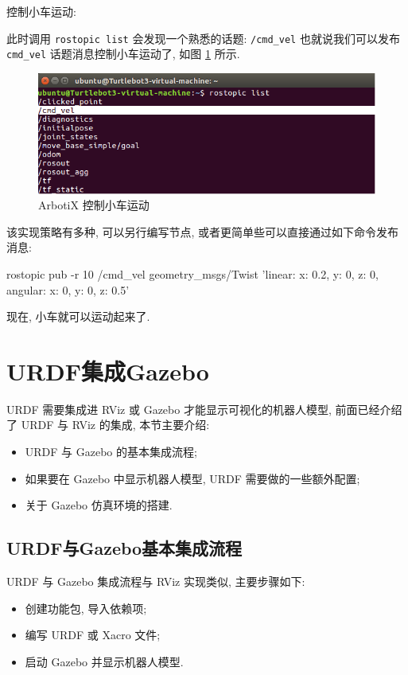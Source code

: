 \documentclass[openany, fontset=windowsold]{ctexbook}
\theoremstyle{kaiti}
\theoremstyle{normal}
\begin{document}
控制小车运动:

此时调用 \verb|rostopic list| 会发现一个熟悉的话题: \verb|/cmd_vel| 也就说我们可以发布 \verb|cmd_vel| 话题消息控制小车运动了, 如图 \ref{fig:arbotix_cmd_vel} 所示.

\begin{figure}[!ht]
  \centering
  \includegraphics[width=.9\textwidth]{arbotix_cmd_vel.png}
  \caption{ArbotiX 控制小车运动}
  \label{fig:arbotix_cmd_vel}
\end{figure}

该实现策略有多种, 可以另行编写节点, 或者更简单些可以直接通过如下命令发布消息:

\begin{bash}
  rostopic pub -r 10 /cmd_vel geometry_msgs/Twist '{linear: {x: 0.2, y: 0, z: 0}, angular: {x: 0, y: 0, z: 0.5}}'
\end{bash}

现在, 小车就可以运动起来了.

\section{URDF集成Gazebo}

URDF 需要集成进 RViz 或 Gazebo 才能显示可视化的机器人模型, 前面已经介绍了 URDF 与 RViz 的集成, 本节主要介绍:

\begin{itemize}
  \item URDF 与 Gazebo 的基本集成流程; 
  \item 如果要在 Gazebo 中显示机器人模型, URDF 需要做的一些额外配置; 
  \item 关于 Gazebo 仿真环境的搭建.
\end{itemize}

\subsection{URDF与Gazebo基本集成流程}

URDF 与 Gazebo 集成流程与 RViz 实现类似, 主要步骤如下:

\begin{itemize}
  \item 创建功能包, 导入依赖项;
  \item 编写 URDF 或 Xacro 文件;
  \item 启动 Gazebo 并显示机器人模型.
\end{itemize}
\end{document}
